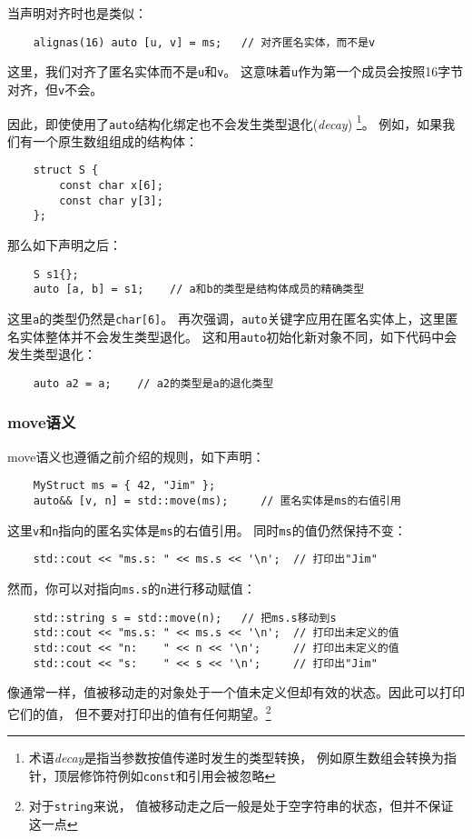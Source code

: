 当声明对齐时也是类似：
\begin{lstlisting}
    alignas(16) auto [u, v] = ms;   // 对齐匿名实体，而不是v
\end{lstlisting}
这里，我们对齐了匿名实体而不是\texttt{u}和\texttt{v}。
这意味着\texttt{u}作为第一个成员会按照16字节对齐，但\texttt{v}不会。

因此，即使使用了\texttt{auto}结构化绑定也不会发生类型退化(\emph{decay})
\footnote{术语\emph{decay}是指当参数按值传递时发生的类型转换，
例如原生数组会转换为指针，顶层修饰符例如\texttt{const}和引用会被忽略}。
例如，如果我们有一个原生数组组成的结构体：
\begin{lstlisting}
    struct S {
        const char x[6];
        const char y[3];
    };
\end{lstlisting}
那么如下声明之后：
\begin{lstlisting}
    S s1{};
    auto [a, b] = s1;    // a和b的类型是结构体成员的精确类型
\end{lstlisting}
这里\texttt{a}的类型仍然是\texttt{char[6]}。
再次强调，\texttt{auto}关键字应用在匿名实体上，这里匿名实体整体并不会发生类型退化。
这和用\texttt{auto}初始化新对象不同，如下代码中会发生类型退化：
\begin{lstlisting}
    auto a2 = a;    // a2的类型是a的退化类型
\end{lstlisting}

\subsubsection*{move语义}
move语义也遵循之前介绍的规则，如下声明：
\begin{lstlisting}
    MyStruct ms = { 42, "Jim" };
    auto&& [v, n] = std::move(ms);     // 匿名实体是ms的右值引用
\end{lstlisting}
这里\texttt{v}和\texttt{n}指向的匿名实体是\texttt{ms}的右值引用。
同时\texttt{ms}的值仍然保持不变：
\begin{lstlisting}
    std::cout << "ms.s: " << ms.s << '\n';  // 打印出"Jim"
\end{lstlisting}
然而，你可以对指向\texttt{ms.s}的\texttt{n}进行移动赋值：
\begin{lstlisting}
    std::string s = std::move(n);   // 把ms.s移动到s
    std::cout << "ms.s: " << ms.s << '\n';  // 打印出未定义的值
    std::cout << "n:    " << n << '\n';     // 打印出未定义的值
    std::cout << "s:    " << s << '\n';     // 打印出"Jim"
\end{lstlisting}
像通常一样，值被移动走的对象处于一个值未定义但却有效的状态。因此可以打印它们的值，
但不要对打印出的值有任何期望。\footnote{对于\texttt{string}来说，
值被移动走之后一般是处于空字符串的状态，但并不保证这一点}

